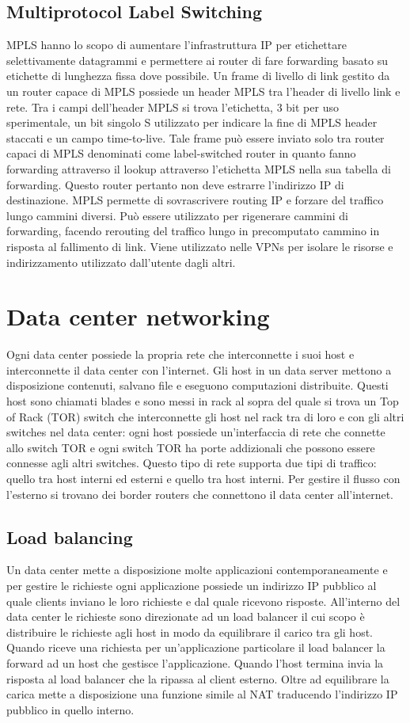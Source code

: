 \subsection{Multiprotocol Label Switching}
MPLS hanno lo scopo di aumentare l'infrastruttura IP per etichettare selettivamente datagrammi e permettere ai router di fare forwarding basato su etichette di lunghezza fissa dove possibile. Un frame di 
livello di link gestito da un router capace di MPLS possiede un header MPLS tra l'header di livello link e rete. Tra i campi dell'header MPLS si trova l'etichetta, 3 bit per uso sperimentale, un bit singolo S utilizzato
per indicare la fine di MPLS header staccati e un campo time-to-live. Tale frame pu\`o essere inviato solo tra router capaci di MPLS denominati come label-switched router in quanto fanno forwarding attraverso
il lookup attraverso l'etichetta MPLS nella sua tabella di forwarding. Questo router pertanto non deve estrarre l'indirizzo IP di destinazione. MPLS permette di sovrascrivere routing IP e forzare del traffico lungo 
cammini diversi. Pu\`o essere utilizzato per rigenerare cammini di forwarding, facendo rerouting del traffico lungo in precomputato cammino in risposta al fallimento di link. Viene utilizzato nelle VPNs per isolare
le risorse e indirizzamento utilizzato dall'utente dagli altri. 
\section{Data center networking}
Ogni data center possiede la propria rete che interconnette i suoi host e interconnette il data center con l'internet. Gli host in un data server mettono a disposizione contenuti, salvano file e eseguono 
computazioni distribuite. Questi host sono chiamati blades e sono messi in rack al sopra del quale si trova un Top of Rack (TOR) switch che interconnette gli host nel rack tra di loro e con gli altri switches nel
data center: ogni host possiede un'interfaccia di rete che connette allo switch TOR e ogni switch TOR ha porte addizionali che possono essere connesse agli altri switches. Questo tipo di rete supporta due tipi
di traffico: quello tra host interni ed esterni e quello tra host interni. Per gestire il flusso con l'esterno si trovano dei border routers che connettono il data center all'internet. 
\subsection{Load balancing}
Un data center mette a disposizione molte applicazioni contemporaneamente e per gestire le richieste ogni applicazione possiede un indirizzo IP pubblico al quale clients inviano le loro richieste e dal quale 
ricevono risposte. All'interno del data center le richieste sono direzionate ad un load balancer il cui scopo \`e distribuire le richieste agli host in modo da equilibrare il carico tra gli host. Quando riceve una 
richiesta per un'applicazione particolare il load balancer la forward ad un host che gestisce l'applicazione. Quando l'host termina invia la risposta al load balancer che la ripassa al client esterno.  Oltre ad 
equilibrare la carica mette a disposizione una funzione simile al NAT traducendo l'indirizzo IP pubblico in quello interno.
